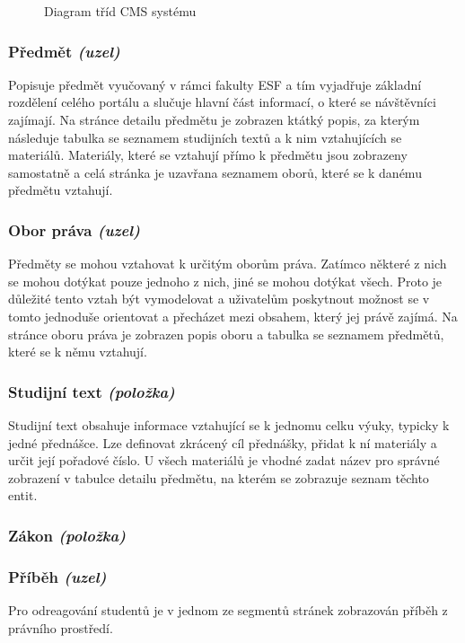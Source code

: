 \begin{figure}[htp] 
\caption{Diagram tříd CMS systému}
\label{fig:class-diagram}
\end{figure}  

\subsubsection*{Předmět \emph{(uzel)}}
Popisuje předmět vyučovaný v rámci fakulty ESF a tím vyjadřuje základní rozdělení celého portálu a slučuje hlavní část informací, o které se návštěvníci zajímají. Na stránce detailu předmětu je zobrazen ktátký popis, za kterým následuje tabulka se seznamem studijních textů a k nim vztahujících se materiálů. Materiály, které se vztahují přímo k předmětu jsou zobrazeny samostatně a celá stránka je uzavřana seznamem oborů, které se k danému předmětu vztahují.

\subsubsection*{Obor práva \emph{(uzel)}}
Předměty se mohou vztahovat k určitým oborům práva. Zatímco některé z nich se mohou dotýkat pouze jednoho z nich, jiné se mohou dotýkat všech. Proto je důležité tento vztah být vymodelovat a uživatelům poskytnout možnost se v tomto jednoduše orientovat a přecházet mezi obsahem, který jej právě zajímá. Na stránce oboru práva je zobrazen popis oboru a tabulka se seznamem předmětů, které se k němu vztahují.

\subsubsection*{Studijní text \emph{(položka)}}
Studijní text obsahuje informace vztahující se k jednomu celku výuky, typicky k jedné přednášce. Lze definovat zkrácený cíl přednášky, přidat k ní materiály a určit její pořadové číslo. U všech materiálů je vhodné zadat název pro správné zobrazení v tabulce detailu předmětu, na kterém se zobrazuje seznam těchto entit.

\subsubsection*{Zákon \emph{(položka)}}


\subsubsection*{Příběh \emph{(uzel)}}
Pro odreagování studentů je v jednom ze segmentů stránek zobrazován příběh z právního prostředí. 

